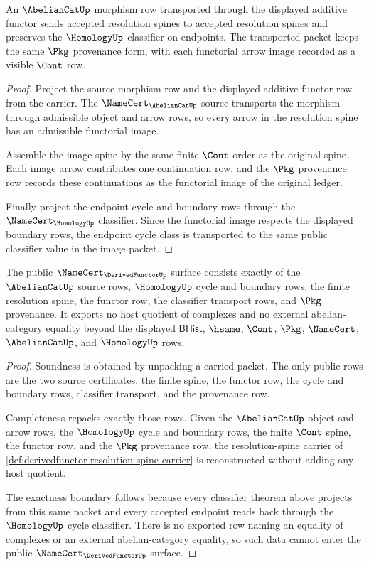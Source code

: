 \begin{theorem}\label{thm:derivedfunctor-functorial-transport-obligation}
An $\AbelianCatUp$ morphism row transported through the displayed additive functor sends accepted resolution spines to accepted resolution spines and preserves the $\HomologyUp$ classifier on endpoints. The transported packet keeps the same $\Pkg$ provenance form, with each functorial arrow image recorded as a visible $\Cont$ row.
\end{theorem}
\begin{proof}
Project the source morphism row and the displayed additive-functor row from the carrier. The $\NameCert_{\AbelianCatUp}$ source transports the morphism through admissible object and arrow rows, so every arrow in the resolution spine has an admissible functorial image.

Assemble the image spine by the same finite $\Cont$ order as the original spine. Each image arrow contributes one continuation row, and the $\Pkg$ provenance row records these continuations as the functorial image of the original ledger.

Finally project the endpoint cycle and boundary rows through the $\NameCert_{\HomologyUp}$ classifier. Since the functorial image respects the displayed boundary rows, the endpoint cycle class is transported to the same public classifier value in the image packet.
\end{proof}

\begin{theorem}\label{thm:derivedfunctor-ledger-exactness-obligation}
The public $\NameCert_{\DerivedFunctorUp}$ surface consists exactly of the $\AbelianCatUp$ source rows, $\HomologyUp$ cycle and boundary rows, the finite resolution spine, the functor row, the classifier transport rows, and $\Pkg$ provenance. It exports no host quotient of complexes and no external abelian-category equality beyond the displayed $\mathsf{BHist}$, $\hsame$, $\Cont$, $\Pkg$, $\NameCert$, $\AbelianCatUp$, and $\HomologyUp$ rows.
\end{theorem}
\begin{proof}
Soundness is obtained by unpacking a carried packet. The only public rows are the two source certificates, the finite spine, the functor row, the cycle and boundary rows, classifier transport, and the provenance row.

Completeness repacks exactly those rows. Given the $\AbelianCatUp$ object and arrow rows, the $\HomologyUp$ cycle and boundary rows, the finite $\Cont$ spine, the functor row, and the $\Pkg$ provenance row, the resolution-spine carrier of \autoref{def:derivedfunctor-resolution-spine-carrier} is reconstructed without adding any host quotient.

The exactness boundary follows because every classifier theorem above projects from this same packet and every accepted endpoint reads back through the $\HomologyUp$ cycle classifier. There is no exported row naming an equality of complexes or an external abelian-category equality, so such data cannot enter the public $\NameCert_{\DerivedFunctorUp}$ surface.
\end{proof}

